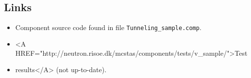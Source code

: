 \subsection*{Links}
\begin{itemize}
  \item Component source code found in file \texttt{Tunneling\_sample.comp}.
  \item \textless{}A HREF="http://neutron.risoe.dk/mcstas/components/tests/v\_sample/"\textgreater{}Test
  \item results\textless{}/A\textgreater{} (not up-to-date).
\end{itemize}
